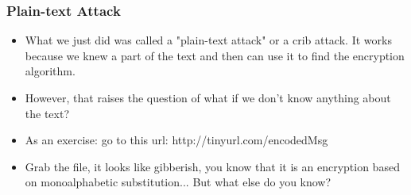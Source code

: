 \documentclass{beamer}
\begin{document}
\begin{frame}
    \frametitle{Plain-text Attack}
    \begin{itemize}
        \item What we just did was called a "plain-text attack" or a crib
            attack. It works because we knew a part of the text and then
            can use it to find the encryption algorithm.
        \item However, that raises the question of what if we don't know
            anything about the text?
        \item As an exercise: go to this url: http://tinyurl.com/encodedMsg
        \item Grab the file, it looks like gibberish, you know that it is an
            encryption based on monoalphabetic substitution... But what else do
            you know?
    \end{itemize}
\end{frame}
\end{document}
